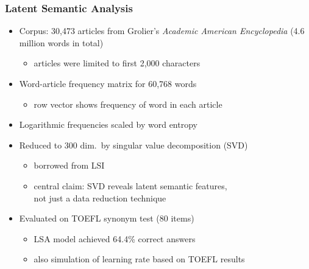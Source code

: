 \begin{frame}
  \frametitle{Latent Semantic Analysis \citep{Landauer:Dumais:97}}

  \begin{itemize}
  \item Corpus: 30,473 articles from Grolier's \emph{Academic American Encyclopedia} (4.6 million words in total)
    \begin{itemize}
    \item[\hand] articles were limited to first 2,000 characters
    \end{itemize}
  \item Word-article frequency matrix for 60,768 words
    \begin{itemize}
    \item row vector shows frequency of word in each article
    \end{itemize}
  \item Logarithmic frequencies scaled by word entropy
  \item Reduced to 300 dim.\ by singular value decomposition (SVD)
    \begin{itemize}
    \item borrowed from LSI \citep{Dumais:etc:88}
    \item[\hand] central claim: SVD reveals latent semantic features,\\
      not just a data reduction technique
    \end{itemize}
  \item Evaluated on TOEFL synonym test (80 items)
    \begin{itemize}
    \item LSA model achieved 64.4\% correct answers
    \item also simulation of learning rate based on TOEFL results
    \end{itemize}
  \end{itemize}
\end{frame}

